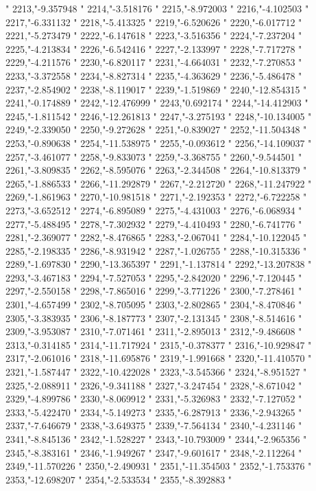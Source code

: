 "
2213,"-9.357948
"
2214,"-3.518176
"
2215,"-8.972003
"
2216,"-4.102503
"
2217,"-6.331132
"
2218,"-5.413325
"
2219,"-6.520626
"
2220,"-6.017712
"
2221,"-5.273479
"
2222,"-6.147618
"
2223,"-3.516356
"
2224,"-7.237204
"
2225,"-4.213834
"
2226,"-6.542416
"
2227,"-2.133997
"
2228,"-7.717278
"
2229,"-4.211576
"
2230,"-6.820117
"
2231,"-4.664031
"
2232,"-7.270853
"
2233,"-3.372558
"
2234,"-8.827314
"
2235,"-4.363629
"
2236,"-5.486478
"
2237,"-2.854902
"
2238,"-8.119017
"
2239,"-1.519869
"
2240,"-12.854315
"
2241,"-0.174889
"
2242,"-12.476999
"
2243,"0.692174
"
2244,"-14.412903
"
2245,"-1.811542
"
2246,"-12.261813
"
2247,"-3.275193
"
2248,"-10.134005
"
2249,"-2.339050
"
2250,"-9.272628
"
2251,"-0.839027
"
2252,"-11.504348
"
2253,"-0.890638
"
2254,"-11.538975
"
2255,"-0.093612
"
2256,"-14.109037
"
2257,"-3.461077
"
2258,"-9.833073
"
2259,"-3.368755
"
2260,"-9.544501
"
2261,"-3.809835
"
2262,"-8.595076
"
2263,"-2.344508
"
2264,"-10.813379
"
2265,"-1.886533
"
2266,"-11.292879
"
2267,"-2.212720
"
2268,"-11.247922
"
2269,"-1.861963
"
2270,"-10.981518
"
2271,"-2.192353
"
2272,"-6.722258
"
2273,"-3.652512
"
2274,"-6.895089
"
2275,"-4.431003
"
2276,"-6.068934
"
2277,"-5.488495
"
2278,"-7.302932
"
2279,"-4.410493
"
2280,"-6.741776
"
2281,"-2.369077
"
2282,"-8.476865
"
2283,"-2.067041
"
2284,"-10.122045
"
2285,"-2.198335
"
2286,"-8.931942
"
2287,"-1.026755
"
2288,"-10.315336
"
2289,"-1.697830
"
2290,"-13.365397
"
2291,"-1.137814
"
2292,"-13.207838
"
2293,"-3.467183
"
2294,"-7.527053
"
2295,"-2.842020
"
2296,"-7.120445
"
2297,"-2.550158
"
2298,"-7.865016
"
2299,"-3.771226
"
2300,"-7.278461
"
2301,"-4.657499
"
2302,"-8.705095
"
2303,"-2.802865
"
2304,"-8.470846
"
2305,"-3.383935
"
2306,"-8.187773
"
2307,"-2.131345
"
2308,"-8.514616
"
2309,"-3.953087
"
2310,"-7.071461
"
2311,"-2.895013
"
2312,"-9.486608
"
2313,"-0.314185
"
2314,"-11.717924
"
2315,"-0.378377
"
2316,"-10.929847
"
2317,"-2.061016
"
2318,"-11.695876
"
2319,"-1.991668
"
2320,"-11.410570
"
2321,"-1.587447
"
2322,"-10.422028
"
2323,"-3.545366
"
2324,"-8.951527
"
2325,"-2.088911
"
2326,"-9.341188
"
2327,"-3.247454
"
2328,"-8.671042
"
2329,"-4.899786
"
2330,"-8.069912
"
2331,"-5.326983
"
2332,"-7.127052
"
2333,"-5.422470
"
2334,"-5.149273
"
2335,"-6.287913
"
2336,"-2.943265
"
2337,"-7.646679
"
2338,"-3.649375
"
2339,"-7.564134
"
2340,"-4.231146
"
2341,"-8.845136
"
2342,"-1.528227
"
2343,"-10.793009
"
2344,"-2.965356
"
2345,"-8.383161
"
2346,"-1.949267
"
2347,"-9.601617
"
2348,"-2.112264
"
2349,"-11.570226
"
2350,"-2.490931
"
2351,"-11.354503
"
2352,"-1.753376
"
2353,"-12.698207
"
2354,"-2.533534
"
2355,"-8.392883
"
